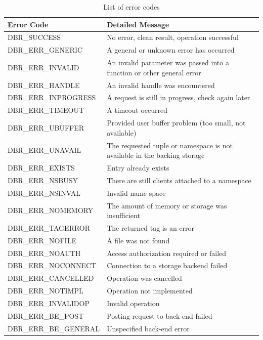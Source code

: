\begin {table}[h]
\begin{tabular}{l|p{10cm}}
	\toprule
	\textbf{Error Code} & \textbf{Detailed Message} \\
	\toprule
	DBR\_SUCCESS &  No error, clean result, operation successful\\ 
    \midrule
	DBR\_ERR\_GENERIC & A general or unknown error has occurred \\ 
	\midrule
	DBR\_ERR\_INVALID & An invalid parameter was passed into a function or other general error \\ 
	\midrule
	DBR\_ERR\_HANDLE  & An invalid handle was encountered \\
	\midrule
	DBR\_ERR\_INPROGRESS & A request is still in progress, check again later  \\ 
	\midrule
	DBR\_ERR\_TIMEOUT & A timeout occurred  \\ 
	\midrule
	DBR\_ERR\_UBUFFER & Provided user buffer problem (too small, not available)  \\ 
	\midrule
	DBR\_ERR\_UNAVAIL & The requested tuple or namespace is not available in the backing storage \\ 
	\midrule
	DBR\_ERR\_EXISTS & Entry already exists \\ 
	\midrule
	DBR\_ERR\_NSBUSY & There are still clients attached to a namespace \\ 
	\midrule
	DBR\_ERR\_NSINVAL & Invalid name space\\ 
	\midrule
	DBR\_ERR\_NOMEMORY & The amount of memory or storage was insufficient \\ 
	\midrule
	DBR\_ERR\_TAGERROR & The returned tag is an error\\ 
	\midrule
	DBR\_ERR\_NOFILE & A file was not found \\ 
	\midrule
	DBR\_ERR\_NOAUTH & Access authorization required or failed\\ 
	\midrule
	DBR\_ERR\_NOCONNECT & Connection to a storage backend failed  \\ 
	\midrule
	DBR\_ERR\_CANCELLED & Operation was cancelled  \\ 
	\midrule
	DBR\_ERR\_NOTIMPL & Operation not implemented \\ 
	\midrule
	DBR\_ERR\_INVALIDOP & Invalid operation  \\ 
	\midrule
	 DBR\_ERR\_BE\_POST & Posting request to back-end failed  \\ 
	\midrule
	DBR\_ERR\_BE\_GENERAL & Unspecified back-end error \\ 
	\bottomrule
\end{tabular} 
\caption {List of error codes} 
\label{table:errorcodes} 
\end{table}


